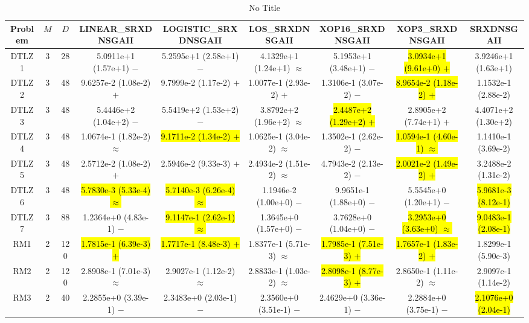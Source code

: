 \documentclass[journal]{IEEEtran}
\begin{document}
\begin{table*}[htbp]
\renewcommand{\arraystretch}{1.2}
\centering
\caption{No Title}
\begin{tabular}{ccccccccc}
\toprule
Problem&$M$&$D$&LINEAR\_SRXDNSGAII&LOGISTIC\_SRXDNSGAII&LOS\_SRXDNSGAII&XOP16\_SRXDNSGAII&XOP3\_SRXDNSGAII&SRXDNSGAII\\
\midrule
\multirow{1}{*}{DTLZ1}&3&28&5.0911e+1 (1.57e+1) $-$&5.2595e+1 (2.58e+1) $-$&4.1329e+1 (1.24e+1) $\approx$&5.1953e+1 (3.48e+1) $-$&\hl{3.0934e+1 (9.61e+0) $+$}&3.9246e+1 (1.63e+1)\\
\hline
\multirow{1}{*}{DTLZ2}&3&48&9.6257e-2 (1.08e-2) $+$&9.7999e-2 (1.17e-2) $+$&1.0077e-1 (2.93e-2) $+$&1.3106e-1 (3.07e-2) $-$&\hl{8.9654e-2 (1.18e-2) $+$}&1.1532e-1 (2.88e-2)\\
\hline
\multirow{1}{*}{DTLZ3}&3&48&5.4446e+2 (1.04e+2) $-$&5.5419e+2 (1.53e+2) $-$&3.8792e+2 (1.96e+2) $\approx$&\hl{2.4487e+2 (1.29e+2) $+$}&2.8905e+2 (7.74e+1) $+$&4.4071e+2 (1.30e+2)\\
\hline
\multirow{1}{*}{DTLZ4}&3&48&1.0674e-1 (1.82e-2) $\approx$&\hl{9.1711e-2 (1.34e-2) $+$}&1.0625e-1 (3.04e-2) $\approx$&1.3502e-1 (2.62e-2) $-$&\hl{1.0594e-1 (4.60e-1) $\approx$}&1.1410e-1 (3.69e-2)\\
\hline
\multirow{1}{*}{DTLZ5}&3&48&2.5712e-2 (1.08e-2) $+$&2.5946e-2 (9.33e-3) $+$&2.4934e-2 (1.51e-2) $\approx$&4.7943e-2 (2.13e-2) $-$&\hl{2.0021e-2 (1.49e-2) $+$}&3.2488e-2 (1.31e-2)\\
\hline
\multirow{1}{*}{DTLZ6}&3&48&\hl{5.7830e-3 (5.33e-4) $\approx$}&\hl{5.7140e-3 (6.26e-4) $\approx$}&1.1946e-2 (1.00e+0) $-$&9.9651e-1 (1.88e+0) $-$&5.5545e+0 (1.20e+1) $-$&\hl{5.9681e-3 (8.12e-1)}\\
\hline
\multirow{1}{*}{DTLZ7}&3&88&1.2364e+0 (4.83e-1) $-$&\hl{9.1147e-1 (2.62e-1) $\approx$}&1.3645e+0 (1.57e+0) $-$&3.7628e+0 (1.04e+0) $-$&\hl{3.2953e+0 (3.63e+0) $\approx$}&\hl{9.0483e-1 (2.08e-1)}\\
\hline
\multirow{1}{*}{RM1}&2&120&\hl{1.7815e-1 (6.39e-3) $+$}&\hl{1.7717e-1 (8.48e-3) $+$}&1.8377e-1 (5.71e-3) $\approx$&\hl{1.7985e-1 (7.51e-3) $+$}&\hl{1.7657e-1 (1.83e-2) $+$}&1.8299e-1 (5.90e-3)\\
\hline
\multirow{1}{*}{RM2}&2&120&2.8908e-1 (7.01e-3) $\approx$&2.9027e-1 (1.12e-2) $\approx$&2.8833e-1 (1.03e-2) $\approx$&\hl{2.8098e-1 (8.77e-3) $+$}&2.8650e-1 (1.11e-2) $\approx$&2.9097e-1 (1.14e-2)\\
\hline
\multirow{1}{*}{RM3}&2&40&2.2855e+0 (3.39e-1) $-$&2.3483e+0 (2.03e-1) $-$&2.3560e+0 (3.51e-1) $-$&2.4629e+0 (3.36e-1) $-$&2.2884e+0 (3.75e-1) $-$&\hl{2.1076e+0 (2.04e-1)}\\

\end{tabular}
\end{table*}
\end{document}
